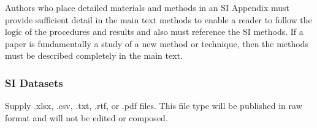 \documentclass[9pt,twoside,lineno]{pnas-new}
\begin{document}
Authors who place detailed materials and methods in an SI Appendix must provide sufficient detail in the main text methods to enable a reader to follow the logic of the procedures and results and also must reference the SI methods. If a paper is fundamentally a study of a new method or technique, then the methods must be described completely in the main text.

\subsubsection*{SI Datasets} 

Supply .xlsx, .csv, .txt, .rtf, or .pdf files. This file type will be published in raw format and will not be edited or composed.




\showacknow %


\end{document}
